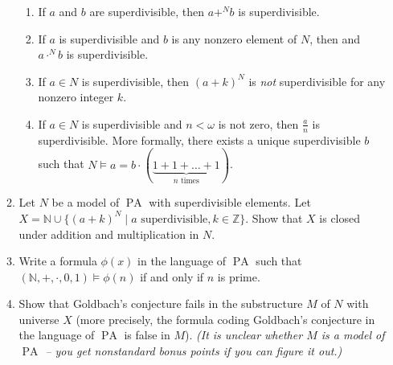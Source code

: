 \documentclass{amsart}
\theoremstyle{definition}
\newcommand{\PA}{\operatorname{PA}}
\begin{document}
\begin{enumerate}
\begin{enumerate}
    \begin{enumerate}
    \item If $a$ and $b$ are superdivisible, then $a +^N b$ is superdivisible.
    \item If $a$ is superdivisible and $b$ is any nonzero element of $N$, then and $a \cdot^N b$ is superdivisible.
    \item If $a \in N$ is superdivisible, then $(a + k)^N$ is \emph{not} superdivisible for any nonzero integer $k$.
    \item If $a \in N$ is superdivisible and $n < \omega$ is not zero, then $\frac{a}{n}$ is superdivisible. More formally, there exists a unique superdivisible $b$ such that $N \models a = b \cdot (\underbrace{1 + 1 + \ldots + 1}_{n \text{ times}})$.
    \end{enumerate}
  \item Let $N$ be a model of $\PA$ with superdivisible elements. Let $X = \mathbb{N} \cup \{(a + k)^N \mid a \text{ superdivisible}, k \in \mathbb{Z}\}$. Show that $X$ is closed under addition and multiplication in $N$.
  \item Write a formula $\phi (x)$ in the language of $\PA$ such that $(\mathbb{N}, +, \cdot, 0, 1) \models \phi (n)$ if and only if $n$ is prime.
  \item Show that Goldbach's conjecture fails in the substructure $M$ of $N$ with universe $X$ (more precisely, the formula coding Goldbach's conjecture in the language of $\PA$ is false in $M$). \emph{(It is unclear whether $M$ is a model of $\PA$ -- you get nonstandard bonus points if you can figure it out.)}
  \end{enumerate} 

\end{enumerate}



\end{document}
